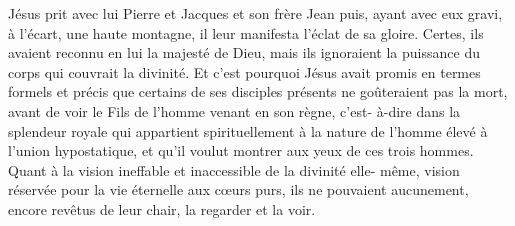 Jésus prit avec lui Pierre et Jacques et son frère Jean puis, ayant avec eux gravi, à l’écart, une haute montagne, il leur manifesta l’éclat de sa gloire. Certes, ils avaient reconnu en lui la majesté de Dieu, mais ils ignoraient la puissance du corps qui couvrait la divinité. Et c’est pourquoi Jésus avait promis en termes formels et précis que certains de ses disciples présents ne goûteraient pas la mort, avant de voir le Fils de l'homme venant en son règne, c’est- à-dire dans la splendeur royale qui appartient spirituellement à la nature de l'homme élevé à l’union hypostatique, et qu’il voulut montrer aux yeux de ces trois hommes. Quant à la vision ineffable et inaccessible de la divinité elle- même, vision réservée pour la vie éternelle aux cœurs purs, ils ne pouvaient aucunement, encore revêtus de leur chair, la regarder et la voir.
